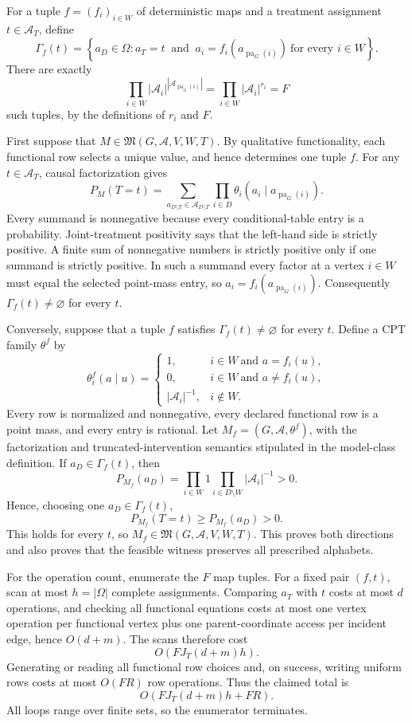 For a tuple \(f=(f_i)_{i\in W}\) of deterministic maps and a treatment assignment \(t\in\mathcal A_T\), define
\[
 \Gamma_f(t)
 =\left\{a_D\in\Omega:
 a_T=t\ \text{ and }\
 a_i=f_i(a_{\operatorname{pa}_G(i)})\ \text{for every }i\in W
 \right\}.
\]
There are exactly
\[
 \prod_{i\in W}
 |\mathcal A_i|^{|\mathcal A_{\operatorname{pa}_G(i)}|}
 =\prod_{i\in W}|\mathcal A_i|^{r_i}=F
\]
such tuples, by the definitions of \(r_i\) and \(F\).

First suppose that \(M\in\mathfrak M(G,\mathcal A,V,W,T)\).  By qualitative functionality, each functional row selects a unique value, and hence determines one tuple \(f\).  For any \(t\in\mathcal A_T\), causal factorization gives
\[
 P_M(T=t)
 =\sum_{a_{D\setminus T}\in\mathcal A_{D\setminus T}}
   \prod_{i\in D}
   \theta_i(a_i\mid a_{\operatorname{pa}_G(i)}).
\]
Every summand is nonnegative because every conditional-table entry is a probability.  Joint-treatment positivity says that the left-hand side is strictly positive.  A finite sum of nonnegative numbers is strictly positive only if one summand is strictly positive.  In such a summand every factor at a vertex \(i\in W\) must equal the selected point-mass entry, so
\(a_i=f_i(a_{\operatorname{pa}_G(i)})\).  Consequently \(\Gamma_f(t)\ne\varnothing\) for every \(t\).

Conversely, suppose that a tuple \(f\) satisfies \(\Gamma_f(t)\ne\varnothing\) for every \(t\).  Define a CPT family \(\theta^f\) by
\[
 \theta^f_i(a\mid u)
 =\begin{cases}
  1, & i\in W\ \text{and }a=f_i(u),\\
  0, & i\in W\ \text{and }a\ne f_i(u),\\
  |\mathcal A_i|^{-1}, & i\notin W.
 \end{cases}
\]
Every row is normalized and nonnegative, every declared functional row is a point mass, and every entry is rational.  Let \(M_f=(G,\mathcal A,\theta^f)\), with the factorization and truncated-intervention semantics stipulated in the model-class definition.  If \(a_D\in\Gamma_f(t)\), then
\[
 P_{M_f}(a_D)
 =\prod_{i\in W}1
  \prod_{i\in D\setminus W}|\mathcal A_i|^{-1}
 >0.
\]
Hence, choosing one \(a_D\in\Gamma_f(t)\),
\[
 P_{M_f}(T=t)
 \ge P_{M_f}(a_D)>0.
\]
This holds for every \(t\), so \(M_f\in\mathfrak M(G,\mathcal A,V,W,T)\).  This proves both directions and also proves that the feasible witness preserves all prescribed alphabets.

For the operation count, enumerate the \(F\) map tuples.  For a fixed pair \((f,t)\), scan at most \(h=|\Omega|\) complete assignments.  Comparing \(a_T\) with \(t\) costs at most \(d\) operations, and checking all functional equations costs at most one vertex operation per functional vertex plus one parent-coordinate access per incident edge, hence \(O(d+m)\).  The scans therefore cost
\[
 O\!\left(FJ_T(d+m)h\right).
\]
Generating or reading all functional row choices and, on success, writing uniform rows costs at most \(O(FR)\) row operations.  Thus the claimed total is
\[
 O\!\left(FJ_T(d+m)h+FR\right).
\]
All loops range over finite sets, so the enumerator terminates.

